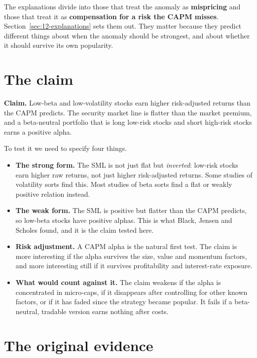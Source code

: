 The explanations divide into those that treat the anomaly as \textbf{mispricing} and those that treat it as \textbf{compensation for a risk the CAPM misses}. Section~\ref{sec:12-explanations} sets them out. They matter because they predict different things about when the anomaly should be strongest, and about whether it should survive its own popularity.

\section{The claim}
\label{sec:12-claim}

\begin{callout}
\textbf{Claim.} Low-beta and low-volatility stocks earn higher risk-adjusted returns than the CAPM predicts. The security market line is flatter than the market premium, and a beta-neutral portfolio that is long low-risk stocks and short high-risk stocks earns a positive alpha.
\end{callout}

To test it we need to specify four things.

\begin{itemize}
  \item \textbf{The strong form.} The SML is not just flat but \emph{inverted}: low-risk stocks earn higher raw returns, not just higher risk-adjusted returns. Some studies of volatility sorts find this. Most studies of beta sorts find a flat or weakly positive relation instead.
  \item \textbf{The weak form.} The SML is positive but flatter than the CAPM predicts, so low-beta stocks have positive alphas. This is what Black, Jensen and Scholes found, and it is the claim tested here.
  \item \textbf{Risk adjustment.} A CAPM alpha is the natural first test. The claim is more interesting if the alpha survives the size, value and momentum factors, and more interesting still if it survives profitability and interest-rate exposure.
  \item \textbf{What would count against it.} The claim weakens if the alpha is concentrated in micro-caps, if it disappears after controlling for other known factors, or if it has faded since the strategy became popular. It fails if a beta-neutral, tradable version earns nothing after costs.
\end{itemize}

\section{The original evidence}
\label{sec:12-evidence}

